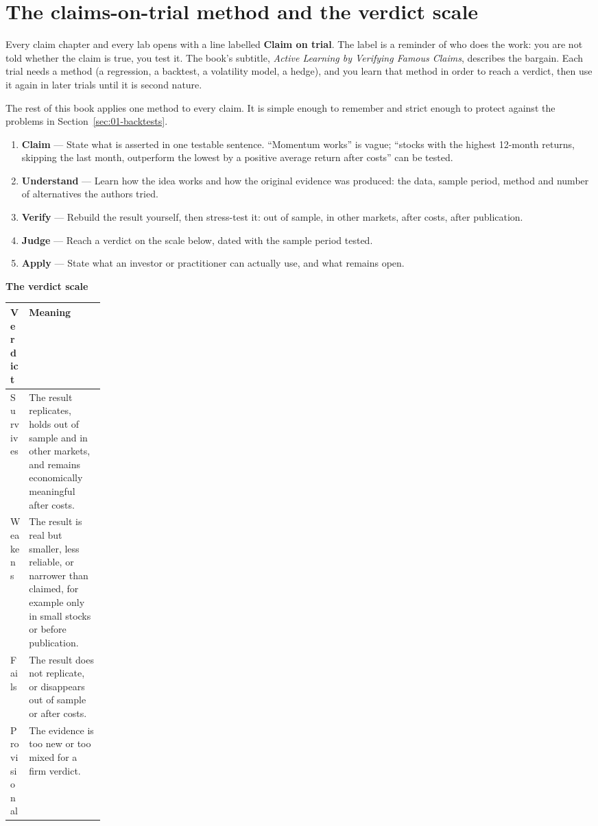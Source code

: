 \section{The claims-on-trial method and the verdict scale}
\label{sec:01-method}

Every claim chapter and every lab opens with a line labelled \textbf{Claim on trial}. The label is a reminder of who does the work: you are not told whether the claim is true, you test it. The book's subtitle, \emph{Active Learning by Verifying Famous Claims}, describes the bargain. Each trial needs a method (a regression, a backtest, a volatility model, a hedge), and you learn that method in order to reach a verdict, then use it again in later trials until it is second nature.

The rest of this book applies one method to every claim. It is simple enough to remember and strict enough to protect against the problems in Section~\ref{sec:01-backtests}.

\begin{enumerate}
  \item \textbf{Claim} --- State what is asserted in one testable sentence. ``Momentum works'' is vague; ``stocks with the highest 12-month returns, skipping the last month, outperform the lowest by a positive average return after costs'' can be tested.
  \item \textbf{Understand} --- Learn how the idea works and how the original evidence was produced: the data, sample period, method and number of alternatives the authors tried.
  \item \textbf{Verify} --- Rebuild the result yourself, then stress-test it: out of sample, in other markets, after costs, after publication.
  \item \textbf{Judge} --- Reach a verdict on the scale below, dated with the sample period tested.
  \item \textbf{Apply} --- State what an investor or practitioner can actually use, and what remains open.
\end{enumerate}

\textbf{The verdict scale}

\begin{center}
\small
\begin{tabularx}{0.9\linewidth}{@{}>{\raggedright\arraybackslash}p{0.162\linewidth}>{\raggedright\arraybackslash}X@{}}
\toprule
Verdict & Meaning \\
\midrule
Survives & The result replicates, holds out of sample and in other markets, and remains economically meaningful after costs. \\
Weakens & The result is real but smaller, less reliable, or narrower than claimed, for example only in small stocks or before publication. \\
Fails & The result does not replicate, or disappears out of sample or after costs. \\
Provisional & The evidence is too new or too mixed for a firm verdict. \\
\bottomrule
\end{tabularx}
\end{center}

